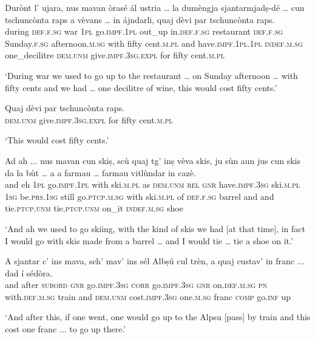 \begin{linenumbers}
\gll  Durònt l’ ujara, nus mavan òrasé ál ustria … la dumèngja sjantarmjadṣ-dé … cun tschuncònta raps a vèvans … in ájndarli, quaj dèvi par tschuncònta raps.  \\
during \textsc{def.f.sg} war \textsc{1pl} go.\textsc{impf.1pl} out\_up in.\textsc{def.f.sg} restaurant {} \textsc{def.f.sg} Sunday.\textsc{f.sg} afternoon.\textsc{m.sg} {} with fifty cent.\textsc{m.pl} and have.\textsc{impf.1pl.1pl} {} \textsc{indef.m.sg} one\_decilitre \textsc{dem.unm} give.\textsc{impf.3sg.expl} for fifty cent.\textsc{m.pl} \\
\end{linenumbers}
\medskip
\glt `During war we used to go up to the restaurant … on Sunday afternoon … with fifty cents and we had … one decilitre of wine, this would cost fifty cents.'
\medskip

\begin{linenumbers}
\gll    Quaj dèvi par tschuncònta raps.\\
\textsc{dem.unm} give.\textsc{impf.3sg.expl} for fifty cent.\textsc{m.pl} \\
\end{linenumbers}
\medskip
\glt `This would cost fifty cents.'
\medskip

\begin{linenumbers}
\gll    Ad ah ... nus mavan cun skiṣ, scù quaj tg’ inṣ vèva skis, ju sùn aun jus cun skis da la bùt … a a farmau … farmau vitlùndar in cazè.\\ 
and eh {} \textsc{1pl} go.\textsc{impf.1pl} with ski.\textsc{m.pl} as \textsc{dem.unm} \textsc{rel} \textsc{gnr} have.\textsc{impf.3sg} ski.\textsc{m.pl} \textsc{1sg} be.\textsc{prs.1sg} still go.\textsc{ptcp.m.sg}  with ski.\textsc{m.pl} of \textsc{def.f.sg} barrel {} and and tie.\textsc{ptcp.unm} {} tie.\textsc{ptcp.unm} on\_it \textsc{indef.m.sg} shoe\\
\end{linenumbers} 
\medskip
\glt `And ah we used to go skiing, with the kind of skis we had [at that time], in fact I would go with skis made from a barrel … and I would tie … tie a shoe on it.'
\medskip

\begin{linenumbers}
\gll    A sjantar c’ ins mava, sch’ mav’ ins sél Albṣú cul trèn, a quaj custav’ in franc ... dad í sédòra.\\
and after \textsc{subord} \textsc{gnr}  go.\textsc{impf.3sg} \textsc{corr} go.\textsc{impf.3sg} \textsc{gnr} on.\textsc{def.m.sg} \textsc{pn} with.\textsc{def.m.sg} train and \textsc{dem.unm} cost.\textsc{impf.3sg} one.\textsc{m.sg}  franc {} \textsc{comp} go.\textsc{inf} up\\
\end{linenumbers}
\medskip
\glt `And after this, if one went, one would go up to the Alpsu [pass] by train and this cost one franc ... to go up there.'
\medskip

